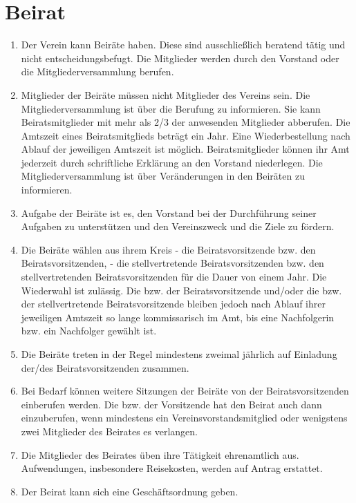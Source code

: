 \documentclass[12pt]{article}
\begin{document}
\section{Beirat}
\begin{enumerate}[label=(\arabic*)]
	\item Der Verein kann Beiräte haben. Diese sind ausschließlich beratend tätig und nicht
	      entscheidungsbefugt. Die Mitglieder werden durch den Vorstand oder die Mitgliederversammlung
	      berufen.
	\item Mitglieder der Beiräte müssen nicht Mitglieder des Vereins sein. Die Mitgliederversammlung ist
	      über die Berufung zu informieren. Sie kann Beiratsmitglieder mit mehr als 2/3 der anwesenden
	      Mitglieder abberufen.
	      Die Amtszeit eines Beiratsmitglieds beträgt ein Jahr. Eine Wiederbestellung nach Ablauf der
	      jeweiligen Amtszeit ist möglich. Beiratsmitglieder können ihr Amt jederzeit durch schriftliche Erklärung
	      an den Vorstand niederlegen. Die Mitgliederversammlung ist über Veränderungen in den Beiräten zu
	      informieren.
	\item Aufgabe der Beiräte ist es, den Vorstand bei der Durchführung seiner Aufgaben zu unterstützen
	      und den Vereinszweck und die Ziele zu fördern.
	\item Die Beiräte wählen aus ihrem Kreis
	      - die Beiratsvorsitzende bzw. den Beiratsvorsitzenden,
	      - die stellvertretende Beiratsvorsitzenden bzw. den stellvertretenden Beiratsvorsitzenden
	      für die Dauer von einem Jahr. Die Wiederwahl ist zulässig. Die bzw. der Beiratsvorsitzende und/oder
	      die bzw. der stellvertretende Beiratsvorsitzende bleiben jedoch nach Ablauf ihrer jeweiligen Amtszeit
	      so lange kommissarisch im Amt, bis eine Nachfolgerin bzw. ein Nachfolger gewählt ist.
	\item Die Beiräte treten in der Regel mindestens zweimal jährlich auf Einladung der/des
	      Beiratsvorsitzenden zusammen.
	\item Bei Bedarf können weitere Sitzungen der Beiräte von der Beiratsvorsitzenden einberufen werden.
	      Die bzw. der Vorsitzende hat den Beirat auch dann einzuberufen, wenn mindestens ein
	      Vereinsvorstandsmitglied oder wenigstens zwei Mitglieder des Beirates es verlangen.
	\item Die Mitglieder des Beirates üben ihre Tätigkeit ehrenamtlich aus. Aufwendungen, insbesondere
	      Reisekosten, werden auf Antrag erstattet.
	\item Der Beirat kann sich eine Geschäftsordnung geben.
\end{enumerate}
\end{document}
